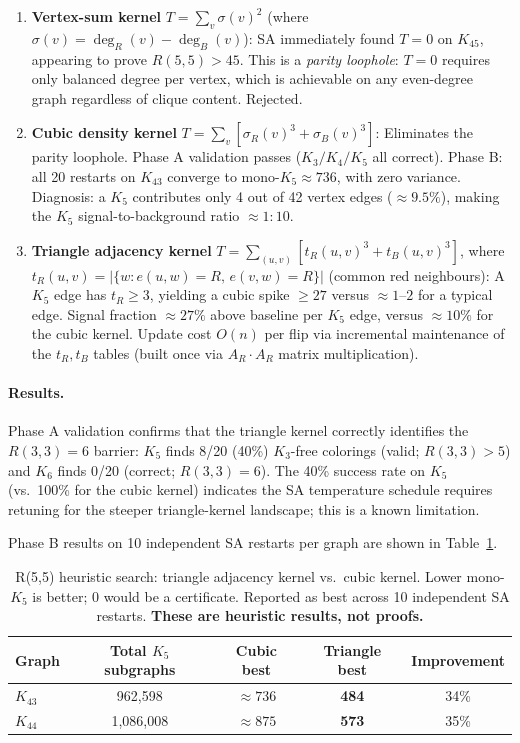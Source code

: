 \documentclass{article}
\begin{document}
\begin{enumerate}[nosep,leftmargin=*]
\item \textbf{Vertex-sum kernel} $T=\sum_v \sigma(v)^2$ (where $\sigma(v)=\deg_R(v)-\deg_B(v)$):
  SA immediately found $T=0$ on $K_{45}$, appearing to prove $R(5,5)>45$.
  This is a \emph{parity loophole}: $T=0$ requires only balanced degree per vertex, which is
  achievable on any even-degree graph regardless of clique content.  Rejected.

\item \textbf{Cubic density kernel} $T=\sum_v [\sigma_R(v)^3 + \sigma_B(v)^3]$:
  Eliminates the parity loophole.  Phase A validation passes ($K_3/K_4/K_5$ all correct).
  Phase B: all 20 restarts on $K_{43}$ converge to mono-$K_5\approx 736$, with zero variance.
  Diagnosis: a $K_5$ contributes only 4 out of 42 vertex edges ($\approx9.5\%$),
  making the $K_5$ signal-to-background ratio $\approx1\!:\!10$.

\item \textbf{Triangle adjacency kernel} $T=\sum_{(u,v)}[t_R(u,v)^3 + t_B(u,v)^3]$,
  where $t_R(u,v)=|\{w : e(u,w)=R,\,e(v,w)=R\}|$ (common red neighbours):
  A $K_5$ edge has $t_R\ge3$, yielding a cubic spike $\ge27$ versus $\approx1$--$2$ for a
  typical edge.  Signal fraction $\approx27\%$ above baseline per $K_5$ edge, versus
  $\approx10\%$ for the cubic kernel.  Update cost $O(n)$ per flip via incremental
  maintenance of the $t_R,t_B$ tables (built once via $A_R \cdot A_R$ matrix multiplication).
\end{enumerate}

\paragraph{Results.}
Phase A validation confirms that the triangle kernel correctly identifies the $R(3,3)=6$
barrier: $K_5$ finds 8/20 (40\%) $K_3$-free colorings (valid; $R(3,3)>5$) and $K_6$ finds 0/20
(correct; $R(3,3)=6$).
The 40\% success rate on $K_5$ (vs.\ 100\% for the cubic kernel) indicates the SA temperature
schedule requires retuning for the steeper triangle-kernel landscape; this is a known limitation.

Phase B results on 10 independent SA restarts per graph are shown in Table~\ref{tab:r55}.

\begin{table}[h]
  \caption{R(5,5) heuristic search: triangle adjacency kernel vs.\ cubic kernel.
           Lower mono-$K_5$ is better; 0 would be a certificate.
           Reported as best across 10 independent SA restarts.
           \textbf{These are heuristic results, not proofs.}}
  \label{tab:r55}
  \centering
  \small
  \begin{tabular}{lcccc}
    \toprule
    Graph & Total $K_5$ subgraphs & Cubic best & Triangle best & Improvement \\
    \midrule
    $K_{43}$ & 962,598   & $\approx736$ & \textbf{484} & 34\% \\
    $K_{44}$ & 1,086,008 & $\approx875$ & \textbf{573} & 35\% \\
    \bottomrule
  \end{tabular}
\end{table}
\end{document}
